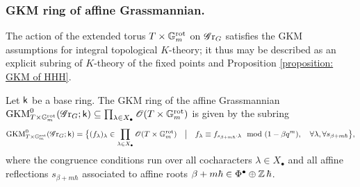 \subsubsection{GKM ring of affine Grassmannian.}\label{subsubsection: GKM ring of affine Grassmannian}
The action of the extended torus $T \times \mathbb{G}_m^{\mathrm{rot}}$ on $\operatorname{\mathscr{G}r}_G$ satisfies the GKM assumptions for integral topological $K$-theory; it thus may be described as an explicit subring of $K$-theory of the fixed points \cite{HHH05} and Proposition \ref{proposition: GKM of HHH}.
\begin{notation}\label{notation: GKM of Gr}
Let $\mathsf{k}$ be a base ring.
The GKM ring of the affine Grassmannian $\operatorname{GKM}^{0}_{T \times \mathbb{G}_m^{\mathrm{rot}}}(\operatorname{\mathscr{G}r}_G; \mathsf{k}) \subseteq \prod_{\lambda \in X_{\bullet}} \operatorname{\mathscr{O}}(T \times \mathbb{G}_m^{\mathrm{rot}})$ is given by the subring
\begin{equation*}
    \operatorname{GKM}^{0}_{T \times \mathbb{G}_m^{\mathrm{rot}}}(\operatorname{\mathscr{G}r}_G; \mathsf{k}) 
    = \bigl\{ (f_{\lambda})_{\lambda} \in \prod_{\lambda \in X_{\bullet}} \operatorname{\mathscr{O}}(T \times \mathbb{G}_m^{\mathrm{rot}}) \quad \big| \quad f_{\lambda} \equiv f_{s_{\beta + m\hbar} \cdot \lambda} \mod (1 - {\beta}q^m), \quad \forall \lambda, \forall s_{\beta + m\hbar} \bigr\},
\end{equation*}
where the congruence conditions run over all cocharacters $\lambda \in X_{\bullet}$ and all affine reflections $s_{\beta +m\hbar}$ associated to affine roots $\beta + m\hbar \in \Phi^{\bullet} \oplus \operatorname{\mathbb{Z}}\hbar$.
\end{notation}

